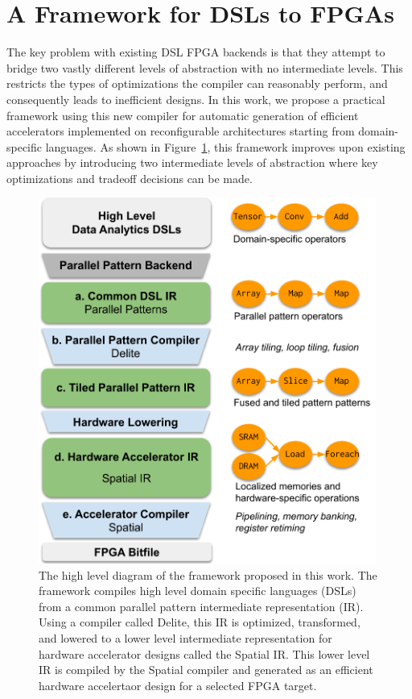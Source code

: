 \section{A Framework for DSLs to FPGAs}
The key problem with existing DSL FPGA backends is that they attempt
to bridge two vastly different levels of abstraction with no intermediate
levels. This restricts the types of optimizations the compiler can reasonably
perform, and consequently leads to inefficient designs.
In this work, we propose a practical framework using this
new compiler for automatic generation of
efficient accelerators implemented on reconfigurable architectures starting
from domain-specific languages. As shown in Figure~\ref{fig:system-diag}, this
framework improves upon existing approaches by introducing two intermediate levels of
abstraction where key optimizations and tradeoff decisions can be made.

\begin{figure}
\centering
\includegraphics[height=12cm]{1-intro/figs/system-diag}
\caption{\label{fig:system-diag}The high level diagram of the framework proposed in this work.
The framework compiles high level domain specific languages (DSLs) from a
common parallel pattern intermediate representation (IR). Using a compiler
called Delite, this IR is optimized, transformed, and lowered to a lower level
intermediate representation for hardware accelerator designs called the Spatial IR.
This lower level IR is compiled by the Spatial compiler and generated
as an efficient hardware accelertaor design for a selected FPGA target.}
\end{figure}

